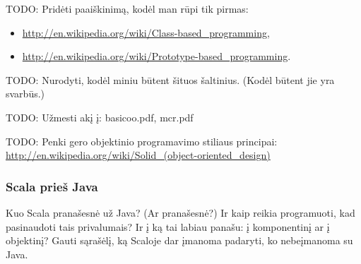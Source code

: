 TODO: Pridėti paaiškinimą, kodėl man rūpi tik pirmas:
\begin{itemize}
  \item \url{http://en.wikipedia.org/wiki/Class-based_programming},
  \item \url{http://en.wikipedia.org/wiki/Prototype-based_programming}.
\end{itemize}

TODO: Nurodyti, kodėl miniu būtent šituos šaltinius. (Kodėl būtent jie
yra svarbūs.)

TODO: Užmesti akį į: basicoo.pdf, mcr.pdf

TODO: Penki gero objektinio programavimo stiliaus principai:
\url{http://en.wikipedia.org/wiki/Solid_(object-oriented_design)}

\subsubsection{Scala prieš Java}

Kuo Scala pranašesnė už Java? (Ar pranašesnė?) Ir kaip reikia
programuoti, kad pasinaudoti tais privalumais? Ir į ką tai labiau
panašu: į komponentinį ar į objektinį?
Gauti sąrašėlį, ką Scaloje dar įmanoma padaryti, ko nebeįmanoma
su Java.

